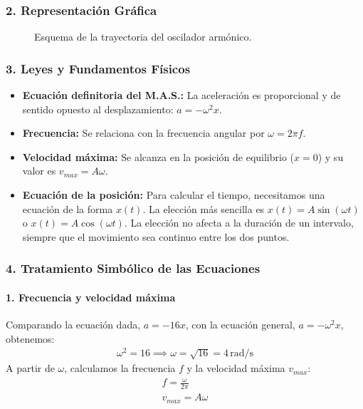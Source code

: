 \subsubsection*{2. Representación Gráfica}
\begin{figure}[H]
    \centering
    \caption{Esquema de la trayectoria del oscilador armónico.}
\end{figure}

\subsubsection*{3. Leyes y Fundamentos Físicos}
\begin{itemize}
    \item \textbf{Ecuación definitoria del M.A.S.:} La aceleración es proporcional y de sentido opuesto al desplazamiento: $a = -\omega^2 x$.
    \item \textbf{Frecuencia:} Se relaciona con la frecuencia angular por $\omega = 2\pi f$.
    \item \textbf{Velocidad máxima:} Se alcanza en la posición de equilibrio ($x=0$) y su valor es $v_{max} = A\omega$.
    \item \textbf{Ecuación de la posición:} Para calcular el tiempo, necesitamos una ecuación de la forma $x(t)$. La elección más sencilla es $x(t) = A\sin(\omega t)$ o $x(t) = A\cos(\omega t)$. La elección no afecta a la duración de un intervalo, siempre que el movimiento sea continuo entre los dos puntos.
\end{itemize}

\subsubsection*{4. Tratamiento Simbólico de las Ecuaciones}
\paragraph{1. Frecuencia y velocidad máxima}
Comparando la ecuación dada, $a=-16x$, con la ecuación general, $a=-\omega^2x$, obtenemos:
\begin{gather}
    \omega^2 = 16 \implies \omega = \sqrt{16} = 4 \, \text{rad/s}
\end{gather}
A partir de $\omega$, calculamos la frecuencia $f$ y la velocidad máxima $v_{max}$:
\begin{gather}
    f = \frac{\omega}{2\pi} \\
    v_{max} = A\omega
\end{gather}
